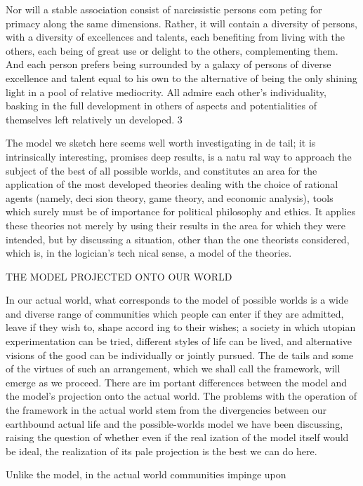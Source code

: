\documentclass[11pt,openany]{book}
\begin{document}
Nor will a stable association consist of narcissistic persons com peting for primacy along the same dimensions. Rather, it will contain a diversity of persons, with a diversity of excellences and talents, each benefiting from living with the others, each being of great use or delight to the others, complementing them. And each person prefers being surrounded by a galaxy of persons of diverse excellence and talent equal to his own to the alternative of being the only shining light in a pool of relative mediocrity. All admire each other's individuality, basking in the full development in others of aspects and potentialities of themselves left relatively un developed. 3 

The model we sketch here seems well worth investigating in de tail; it is intrinsically interesting, promises deep results, is a natu ral way to approach the subject of the best of all possible worlds, and constitutes an area for the application of the most developed theories dealing with the choice of rational agents (namely, deci sion theory, game theory, and economic analysis), tools which surely must be of importance for political philosophy and ethics. It applies these theories not merely by using their results in the area for which they were intended, but by discussing a situation, other than the one theorists considered, which is, in the logician's tech nical sense, a model of the theories. 

THE MODEL PROJECTED ONTO OUR WORLD 

In our actual world, what corresponds to the model of possible worlds is a wide and diverse range of communities which people can enter if they are admitted, leave if they wish to, shape accord ing to their wishes; a society in which utopian experimentation can be tried, different styles of life can be lived, and alternative visions of the good can be individually or jointly pursued. The de tails and some of the virtues of such an arrangement, which we shall call the framework, will emerge as we proceed. There are im portant differences between the model and the model's projection onto the actual world. The problems with the operation of the framework in the actual world stem from the divergencies between our earthbound actual life and the possible-worlds model we have been discussing, raising the question of whether even if the real ization of the model itself would be ideal, the realization of its pale projection is the best we can do here. 

Unlike the model, in the actual world communities impinge upon 
\end{document}
